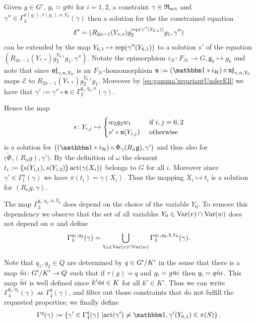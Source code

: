 \documentclass[a4paper,11pt]{amsart}
\begin{document}
Given $g\in G'$, $g_i = g\at{i}$ for $i=1,2$, a constraint $\gamma\in\mathfrak{R}_
{\operatorname{act}}$
 and $\gamma''\in \Gamma_3^{\pi(g_1),\pi(g_1),n,Y_0}(\gamma)$ then  a solution for
the the constrained equation
\[\mathcal{E}'=(R_{2n-1}(Y_{*,*})g_2^{\operatorname{rep}(\gamma''({Y_{6,1}}))}
g_1,\gamma'') \]
can be extended by the map
${Y_{6,1}}\mapsto \operatorname{rep}(\gamma''({Y_{6,1}}))$ to a solution
$s'$ of the equation
$(R_{2n-1}(Y_{*,*}) g_2^{{Y_{6,1}}} g_1,\gamma'')$. 
Notate the epimorphism $i_{\mathcal{H}}\colon F_{\mathcal H} \to G,
 \mathfrak g_k \mapsto g_k$ and note that since $\mathfrak{nf}_{\gamma,n,Y_0}$ is an 
$F_{\mathcal{H}}$-homomorphism $\mathfrak n :=(\id * i_{\mathcal H}) \circ \nf_
{\gamma,n,Y_0}$
maps $\mathcal{E}$ to $R_{2n-1}(Y_{*,*}) g_2^
{{Y_{6,1}}}g_1$. Moreover by \eqref{eq:gamma'invariantUnderEll} we have that
$\gamma' := \gamma''\circ \mathfrak{n}\in\Gamma_2^{q_1,q_2,n}(\gamma)$.

Hence the map 
\[s \colon Y_{i,j}\mapsto \begin{cases}
w_2 g_2w_1 &\textup{ if } 
{i,j}= 6,2 \\
s'\circ \mathfrak n (Y_{i,j}) &\textup{ otherwise}
\end{cases}
\]
is a solution for $\big((\id*i_{\mathcal{H}})\circ\Phi_\gamma(R_n\mathfrak g),
\gamma')$ and thus also for $\big(\tilde\Phi_\gamma(R_n g),\gamma'\big)$.
By the definition of $\omega$ the element
$t_i:=\langle\negthickspace\langle s(Y_{i,1}),s(Y_{i,2})\rangle\negthickspace\rangle\operatorname{act}(\gamma(X_i))$ belongs to $G$
for all $i$. Moreover since $\gamma'\in\Gamma_1^n(\gamma)$ we have $\pi
(t_i)=\gamma(X_i)$. Thus the mapping
$X_i\mapsto t_i$
is a solution for $(R_ng,\gamma)$.

The map $\Gamma_3^{q_1,q_2,n,Y_0}$ does depend on the choice of the
variable $Y_0$.  To remove this dependency we observe that the set of
all variables $Y_0 \in \textup{Var}(v)\cap \textup{Var}(w)$ does not depend on $n$ and
define
\[\Gamma_4^{q_1,q_2}(\gamma)=  \bigcup_{Y_0\in \textup{Var}(v)\cap\textup{Var}(w)}
\Gamma_3^{q_1,q_2,3,Y_0}(\gamma).\]

Note that $q_{1},q_2\in Q$ are determined by $q\in{G'/K'}$ in the
sense that there is a map $\att{i}\colon \RNK{G'}{K'}\to Q$ such that
if $\tau(g) = q$ and $g_i=g\at{i}$ then $q_i = q\att{i}$. This map $\att{i}$ is well defined since $k'\at{i}\in K$ for all $k'\in K'$. Thus we can write
$\Gamma_4^{q_1,q_2}(\gamma)$ as $\Gamma_4^q(\gamma)$, and filter out
those constraints that do not fulfill the requested properties; we
finally define
 \begin{align}
 \Gamma^q(\gamma) := \left\{\gamma' \in \Gamma_4^q(\gamma) \bigmid 
  \act(\gamma')\neq\id, \gamma'({Y_{6,1}}) \in \pi(S) \right\}. 
  \label{def:Gammaq}
 \end{align}
\end{document}
